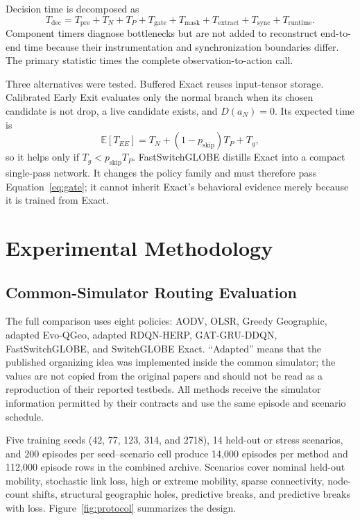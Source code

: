\documentclass[drones,article,submit,moreauthors]{Definitions/mdpi}
\newcommand{\SG}{SwitchGLOBE}
\newcommand{\FastSG}{FastSwitchGLOBE}
\newcommand{\E}{\mathbb{E}}
\begin{document}
Decision time is decomposed as
\begin{equation}
T_{\mathrm{dec}}=T_{\mathrm{pre}}+T_N+T_P+T_{\mathrm{gate}}+T_{\mathrm{mask}}+T_{\mathrm{extract}}+T_{\mathrm{sync}}+T_{\mathrm{runtime}}.
\end{equation}
Component timers diagnose bottlenecks but are not added to reconstruct end-to-end time because their instrumentation and synchronization boundaries differ. The primary statistic times the complete observation-to-action call.

Three alternatives were tested. Buffered Exact reuses input-tensor storage. Calibrated Early Exit evaluates only the normal branch when its chosen candidate is not drop, a live candidate exists, and $D(a_N)=0$. Its expected time is
\begin{equation}
\E[T_{EE}]=T_N+(1-p_{\mathrm{skip}})T_P+T_g,
\end{equation}
so it helps only if $T_g<p_{\mathrm{skip}}T_P$. \FastSG{} distills Exact into a compact single-pass network. It changes the policy family and must therefore pass Equation~\eqref{eq:gate}; it cannot inherit Exact's behavioral evidence merely because it is trained from Exact.

\section{Experimental Methodology}

\subsection{Common-Simulator Routing Evaluation}

The full comparison uses eight policies: AODV, OLSR, Greedy Geographic, adapted Evo-QGeo, adapted RDQN-HERP, GAT-GRU-DDQN, \FastSG{}, and \SG{} Exact. ``Adapted'' means that the published organizing idea was implemented inside the common simulator; the values are not copied from the original papers and should not be read as a reproduction of their reported testbeds. All methods receive the simulator information permitted by their contracts and use the same episode and scenario schedule.

Five training seeds (42, 77, 123, 314, and 2718), 14 held-out or stress scenarios, and 200 episodes per seed--scenario cell produce 14,000 episodes per method and 112,000 episode rows in the combined archive. Scenarios cover nominal held-out mobility, stochastic link loss, high or extreme mobility, sparse connectivity, node-count shifts, structural geographic holes, predictive breaks, and predictive breaks with loss. Figure~\ref{fig:protocol} summarizes the design.
\end{document}
